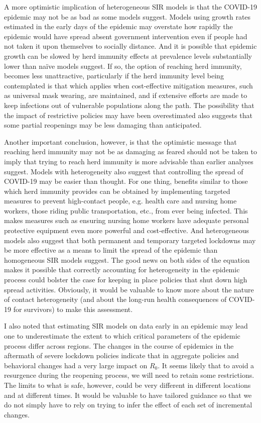\documentclass[11pt]{article}
\begin{document}
A more optimistic implication of heterogeneous SIR models is that the COVID-19 epidemic may not be as bad as some models 
suggest. Models using growth rates estimated in the early days of the epidemic may overstate how rapidly the epidemic would have spread absent government intervention even if people had not taken it upon themselves to socially distance.
And it is possible that epidemic growth can be slowed by herd immunity effects at prevalence levels substantially lower
than na\"ive models suggest. If so, the option of reaching herd immunity, becomes less unattractive, particularly
if the herd immunity level being contemplated is that which applies when cost-effective mitigation measures, such as universal mask wearing, are maintained, and if extensive efforts are made to keep infections out of vulnerable populations along the path. The possibility that the impact of restrictive policies may have been overestimated also suggests that some partial reopenings may be less damaging than anticipated.

Another important conclusion, however, is that the optimistic message  that reaching herd immunity may not be as damaging as feared should not be taken to imply that trying to reach herd immunity is more advisable than earlier analyses suggest. Models with heterogeneity also suggest that controlling the 
spread of COVID-19 may be easier than thought. For one thing, benefits similar to those which herd immunity 
provides can be obtained by implementing targeted measures to prevent high-contact people, e.g. health care and nursing home workers, those riding public transportation, etc., from ever being infected. This makes measures such as ensuring nursing home workers have adequate personal protective equipment even more powerful and cost-effective. And heterogeneous models also suggest that both permanent and temporary targeted lockdowns may be more effective as a means to limit the spread of the epidemic than homogeneous SIR models suggest. The good news on both sides of the equation makes it possible that correctly
accounting for heterogeneity in the epidemic process could bolster the case for keeping in place policies that shut down high spread activities. Obviously, it would be valuable to know more about the nature of contact heterogeneity (and about the long-run health consequences of COVID-19 for survivors) to make this assessment.


I also noted that estimating SIR models on data early in an epidemic may lead one to underestimate the extent to which
critical parameters of the epidemic process differ across regions. The changes in the course of epidemics in the aftermath
of severe lockdown policies indicate that in aggregate policies and behavioral changes had a very large impact on 
$R_0$. It seems likely that to avoid a resurgence during the reopening process, we will need to retain some restrictions. The limits to what is safe, however, could be very different in different locations and
at different times. It would be valuable to have tailored guidance so that we do not simply have to rely on trying to
infer the effect of each set of incremental changes.
\end{document}
